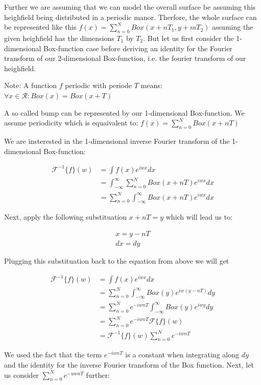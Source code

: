 Further we are assuming that we can model the overall surface be assuming this heighfield being distributed in a periodic manor.
Therfore, the whole surface can be represented like this $f(x) = \sum_{n=0}^{N} Box(x+nT_1, y+mT_2)$ assuming the given heighfield has the dimensions $T_1$ by $T_2$. But let us first consider the 1-dimensional Box-function case before deriving an identity for the Fourier transform of our 2-dimensional Box-function, i.e. the fourier transform of our heighfield. 

Note: A function $f$ periodic with periode $T$ means: $\forall x \in \mathcal{R}: Box(x) = Box(x+T)$

A so called bump can be represented by our 1-dimensional Box-function. We assume periodicity which is equaivalent to:   
$f(x) = \sum_{n=0}^{N} Box(x+nT)$

We are insterested in the 1-dimensional inverse Fourier transform of the 1-dimensional Box-function:

\begin{align*}
\mathcal{F}^{-1}\{f\}(w)
& =\int f(x) e^{iwx}dx\\
& =\int_{-\infty}^{\infty} \sum_{n=0}^{N} Box(x+nT) e^{iwx}dx\\
& =\sum_{n=0}^{N} \int_{-\infty}^{\infty} Box(x+nT) e^{iwx}dx
\end{align*}

Next, apply the following substituation $x+nT = y$ which will lead us to:

\begin{gather*}
x=y-nT\\
dx=dy
\end{gather*} 

Plugging this substituation back to the equation from above we will get 

\begin{align*}
\mathcal{F}^{-1}\{f\}(w)
& =\int f(x) e^{iwx}dx\\
& =\sum_{n=0}^{N} \int_{-\infty}^{\infty} Box(y) e^{iw(y-nT)}dy \\
& =\sum_{n=0}^{N} e^{-iwnT} \int_{-\infty}^{\infty} Box(y) e^{iwy}dy \\
& =\sum_{n=0}^{N} e^{-iwnT} \mathcal{F}\{f\}(w) \\
& =\mathcal{F}^{-1}\{f\}(w) \sum_{n=0}^{N} e^{-iwnT}  
\end{align*}

We used the fact that the term $e^{-iwnT}$ is a constant when integrating along $dy$ and the identity for the inverse Fourier transform of the Box function. Next, let us consider $\sum_{n=0}^N e^{-uwnT}$ further:


